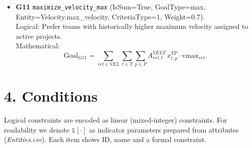 \documentclass[11pt,a4paper]{article}
\begin{document}
\begin{itemize}[leftmargin=2.2em]
  \item \textbf{G11} \texttt{maximize\_velocity\_max} (IsSum=True, GoalType=max, Entity=Velocity.max\_velocity, CriteriaType=1, Weight=0.7). \\
  Logical: Prefer teams with historically higher maximum velocity assigned to active projects. \\
  Mathematical:
  \[
  \text{Goal}_{\mathrm{G11}}=\sum_{vel\in VEL}\sum_{t\in T}\sum_{p\in P} A^{VEL T}_{vel,t}\, x^{TP}_{t,p}\cdot \text{vmax}_{vel}.
  \]
\end{itemize}

\section{4. Conditions}
Logical constraints are encoded as linear (mixed-integer) constraints. For readability we denote $\mathbb{1}[\cdot]$ as indicator parameters prepared from attributes (\emph{Entities.csv}). Each item shows ID, name and a formal constraint.
\end{document}
